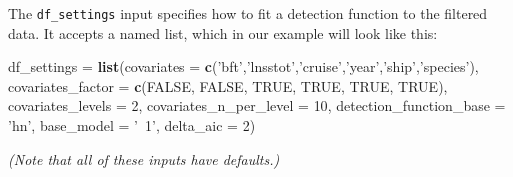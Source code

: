 \documentclass[
]{book}
\newenvironment{Shaded}{\begin{snugshade}}{\end{snugshade}}
\newcommand{\DataTypeTok}[1]{\textcolor[rgb]{0.13,0.29,0.53}{#1}}
\newcommand{\DecValTok}[1]{\textcolor[rgb]{0.00,0.00,0.81}{#1}}
\newcommand{\KeywordTok}[1]{\textcolor[rgb]{0.13,0.29,0.53}{\textbf{#1}}}
\newcommand{\NormalTok}[1]{#1}
\newcommand{\OtherTok}[1]{\textcolor[rgb]{0.56,0.35,0.01}{#1}}
\newcommand{\StringTok}[1]{\textcolor[rgb]{0.31,0.60,0.02}{#1}}
\begin{document}
The \texttt{df\_settings} input specifies how to fit a detection function to the filtered data. It accepts a named list, which in our example will look like this:

\begin{Shaded}
\begin{Highlighting}[]
\NormalTok{df_settings =}\StringTok{ }\KeywordTok{list}\NormalTok{(}\DataTypeTok{covariates =} \KeywordTok{c}\NormalTok{(}\StringTok{'bft'}\NormalTok{,}\StringTok{'lnsstot'}\NormalTok{,}\StringTok{'cruise'}\NormalTok{,}\StringTok{'year'}\NormalTok{,}\StringTok{'ship'}\NormalTok{,}\StringTok{'species'}\NormalTok{),}
                   \DataTypeTok{covariates_factor =} \KeywordTok{c}\NormalTok{(}\OtherTok{FALSE}\NormalTok{, }\OtherTok{FALSE}\NormalTok{, }\OtherTok{TRUE}\NormalTok{, }\OtherTok{TRUE}\NormalTok{, }\OtherTok{TRUE}\NormalTok{, }\OtherTok{TRUE}\NormalTok{),}
                   \DataTypeTok{covariates_levels =} \DecValTok{2}\NormalTok{,}
                   \DataTypeTok{covariates_n_per_level =} \DecValTok{10}\NormalTok{,}
                   \DataTypeTok{detection_function_base =} \StringTok{'hn'}\NormalTok{,}
                   \DataTypeTok{base_model =} \StringTok{'~1'}\NormalTok{,}
                   \DataTypeTok{delta_aic =} \DecValTok{2}\NormalTok{)}
\end{Highlighting}
\end{Shaded}

\emph{(Note that all of these inputs have defaults.)}
\end{document}
